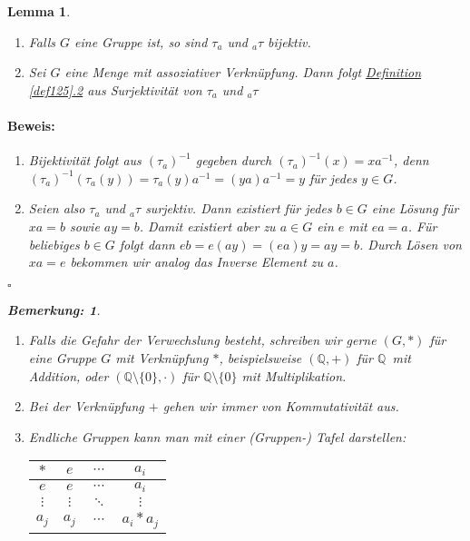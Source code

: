 \documentclass{report}
\newcommand{\Q}{\mathbb{Q}}
\newcommand{\mQ}{$\mathbb{Q}$\ }
\theoremstyle{customrem}
\newtheorem*{bem}{Bemerkung:}
\theoremstyle{customdef}
\newtheorem{lem}[definition]{Lemma}
\renewenvironment{proof}{\vspace{-.75cm}\paragraph{Beweis: }}{\vspace{-.5cm}\hfill$\square$}
\begin{document}
	\begin{lem}$ $\vspace{-.75cm}
		\label{lem128}
		\begin{enumerate}
			\item Falls $G$ eine Gruppe ist, so sind $\tau_a$ und $_{a}\tau$ bijektiv.
			\item Sei $G$ eine Menge mit assoziativer Verknüpfung. Dann folgt \hyperref[def125]{Definition \ref{def125}.2} aus Surjektivität von $\tau_a$ und $_{a}\tau$
		\end{enumerate}
		\vspace{.25cm}
		\begin{proof}
			\begin{enumerate}
				\item Bijektivität folgt aus  $(\tau_a)^{-1}$ gegeben durch $(\tau_a)^{-1}(x) = x a^{-1}$, denn $(\tau_a)^{-1}(\tau_a(y)) = \tau_a(y)a^{-1} = (y a) a^{-1} = y$ für jedes $y \in G$.
				\item Seien also $\tau_a$ und $_{a}\tau$ surjektiv. Dann existiert für jedes $b \in G$ eine Lösung für 
				$x a = b$ sowie $a y = b$. 
				Damit existiert aber zu $a \in G$ ein  $e$ mit $ea = a$. Für beliebiges $b \in G$ folgt dann $e b = e (a y) = (e a) y = ay = b$.	Durch Lösen von $x a = e$ bekommen wir analog das Inverse Element zu $a$.
			\end{enumerate}
		\end{proof}
		\vspace{.25cm}
		\begin{bem}$ $
			\begin{enumerate}
				\item Falls die Gefahr der Verwechslung besteht, schreiben wir gerne $(G, \ast)$ für eine Gruppe $G$ mit Verknüpfung $\ast$, 
					beispielsweise $(\Q, +)$ für \mQ mit Addition, oder $(\Q \setminus \{0\}, \cdot)$ für $\Q \setminus \{0\}$ mit Multiplikation.
				\item Bei der Verknüpfung $+$ gehen wir immer von Kommutativität aus.
				\item Endliche Gruppen kann man mit einer (Gruppen-) Tafel darstellen:
				\begin{center}
					\begin{tabular}{c || c  c  c}
						$\ast$   & $e$      & $\cdots$ & $a_i$	    \\\hline\hline
						$e$      & $e$      & $\cdots$	& $a_i$     \\
						$\vdots$ & $\vdots$ & $\ddots$	& $\vdots$  \\
						$a_j$ 	 &$a_j$     & $\cdots$	& $a_i * a_j$

\end{tabular}
\end{center}
\end{enumerate}
\end{bem}
\end{lem}
\end{document}
